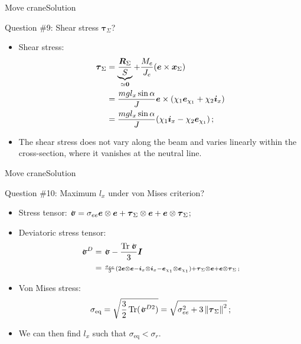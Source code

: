 \documentclass{beamer}
\newcommand{\trace}{\operatorname{Tr}}
\newcommand{\Id}{{\boldsymbol I}}
\newcommand{\xj}{x}
\newcommand{\xv}{{\boldsymbol\xj}}
\newcommand{\ej}{e}
\renewcommand{\ij}{i}
\newcommand{\ev}{{\boldsymbol\ej}}
\newcommand{\iv}{{\boldsymbol\ij}}
\newcommand*{\xiu}{\chi_1}
\newcommand*{\xid}{\chi_2}
\newcommand*{\Mstaticj}{J}
\newcommand*{\stressj}{\sigma}
\newcommand*{\tressj}{\tau}
\newcommand{\stress}{\mbox{$\hspace{0.3em}\rotatebox[x=0pt,y=0.2pt]{90}{\rule{0.017\linewidth}{0.4pt}}\hspace{-0.25em}\upsigma$}}
\newcommand*{\tress}{{\boldsymbol\tressj}}
\newcommand{\Fresj}{R}
\newcommand{\Mresj}{M}
\newcommand{\Fres}{{\boldsymbol\Fresj}}
\newcommand{\bzero}{{\bf 0}}
\newcommand{\norm}[1]{\left\|#1\right\|}
\begin{document}
\begin{frame}{Move crane}{Solution}

\begin{exampleblock}{Question \#9: Shear stress $\tress_\Sigma$?}
\begin{itemize}
\item Shear stress:
\begin{displaymath}
\begin{split}
\tress_\Sigma &=\underbrace{\frac{\Fres_\Sigma}{S}}_{\simeq\bzero}+\frac{\Mresj_e}{\Mstaticj_e}(\ev\times\xv_\Sigma)  \\
&=\frac{mgl_\xj \sin\alpha}{J}\ev\times(\xiu\ev_{\xiu}+\xid\iv_\xj)  \\
&=\frac{mgl_\xj \sin\alpha}{J}(\xiu\iv_\xj-\xid\ev_{\xiu})\,;
\end{split}
\end{displaymath}
\item The shear stress does not vary along the beam and varies linearly within the cross-section, where it vanishes at the neutral line.
\end{itemize}
\end{exampleblock}

\end{frame}

\begin{frame}{Move crane}{Solution}

\begin{exampleblock}{Question \#10: Maximum $l_\xj$ under von Mises criterion?}
\begin{itemize}
\item Stress tensor: $\stress=\stressj_{ee}\ev\otimes\ev+\tress_\Sigma\otimes\ev+\ev\otimes\tress_\Sigma$;
\item Deviatoric stress tensor:
\begin{displaymath}
\begin{split}
\stress^D &=\stress-\frac{\trace\stress}{3}\Id \\
&=\;\scriptstyle \frac{\stressj_{ee}}{3}(2\ev\otimes\ev-\iv_\xj\otimes\iv_\xj-\ev_{\xiu}\otimes\ev_{\xiu})+\tress_\Sigma\otimes\ev+\ev\otimes\tress_\Sigma\,;
\end{split}
\end{displaymath}
\item Von Mises stress:
\begin{displaymath}
\begin{split}
\stressj_\text{eq}=\sqrt{\frac{3}{2}\trace(\stress^{D2})}=\sqrt{\stressj_{ee}^2+3\norm{\tress_\Sigma}^2}\,;
\end{split}
\end{displaymath}
\item We can then find $l_\xj$ such that $\stressj_\text{eq}<\stressj_r$.
\end{itemize}
\end{exampleblock}

\end{frame}
\end{document}
